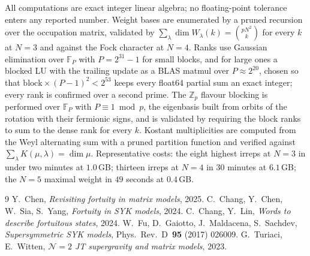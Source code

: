 \documentclass[10pt]{article}
\begin{document}
All computations are exact integer linear algebra; no floating-point tolerance enters any reported number. Weight bases are enumerated by a pruned recursion over the occupation matrix, validated by $\sum_\lambda\dim W_\lambda(k)=\binom{pN^2}{k}$ for every $k$ at $N=3$ and against the Fock character at $N=4$. Ranks use Gaussian elimination over $\mathbb F_P$ with $P=2^{31}-1$ for small blocks, and for large ones a blocked LU with the trailing update as a BLAS matmul over $P\approx2^{20}$, chosen so that $\text{block}\times(P-1)^2<2^{53}$ keeps every float64 partial sum an exact integer; every rank is confirmed over a second prime. The $\mathbb Z_p$ flavour blocking is performed over $\mathbb F_P$ with $P\equiv1\bmod p$, the eigenbasis built from orbits of the rotation with their fermionic signs, and is validated by requiring the block ranks to sum to the dense rank for every $k$. Kostant multiplicities are computed from the Weyl alternating sum with a pruned partition function and verified against $\sum_\lambda K(\mu,\lambda)=\dim\mu$. Representative costs: the eight highest irreps at $N=3$ in under two minutes at $1.0$\,GB; thirteen irreps at $N=4$ in $30$ minutes at $6.1$\,GB; the $N=5$ maximal weight in $49$ seconds at $0.4$\,GB.

\begin{thebibliography}{9}\small
{} Y.~Chen, \emph{Revisiting fortuity in matrix models}, 2025.
 C.~Chang, Y.~Chen, W.~Sia, S.~Yang, \emph{Fortuity in SYK models}, 2024.
 C.~Chang, Y.~Lin, \emph{Words to describe fortuitous states}, 2024.
 W.~Fu, D.~Gaiotto, J.~Maldacena, S.~Sachdev, \emph{Supersymmetric SYK models}, Phys.\ Rev.\ D\ \textbf{95} (2017) 026009.
 G.~Turiaci, E.~Witten, \emph{$\mathcal N=2$ JT supergravity and matrix models}, 2023.
\end{thebibliography}
\end{document}
